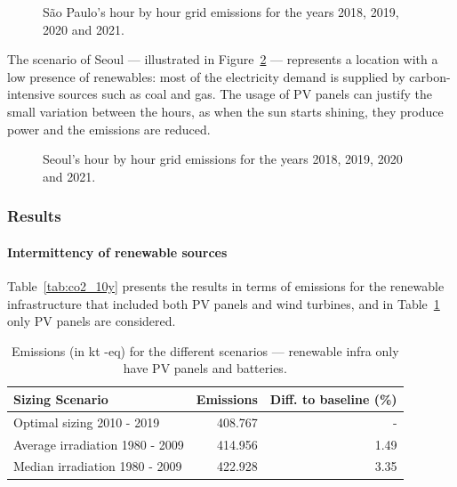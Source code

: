 \begin{figure}[H]
  \centering
  {}
  \caption{São Paulo's hour by hour grid emissions for the years 2018, 2019, 2020 and 2021.}
  \label{fig:co2_sp}
\end{figure}

The scenario of Seoul --- illustrated in Figure~\ref{fig:co2_seoul} --- represents a location with a low presence of renewables: most of the electricity demand is supplied by carbon-intensive sources such as coal and gas. The usage of PV panels can justify the small variation between the hours, as when the sun starts shining, they produce power and the emissions are reduced.


\begin{figure}[H]
  \centering
  {}
  \caption{Seoul's hour by hour grid emissions for the years 2018, 2019, 2020 and 2021.}
  \label{fig:co2_seoul}
\end{figure}




\subsubsection{Results}

\paragraph{Intermittency of renewable sources}

Table~\ref{tab:co2_10y} presents the results in terms of  emissions for the renewable infrastructure that included both PV panels and wind turbines, and in Table~\ref{tab:co2_10y_pv_only} only PV panels are considered.



 \begin{table}[H]   
  \caption{Emissions (in kt -eq) for the different scenarios --- renewable infra only have PV panels and batteries.} \centering

   \label{tab:co2_10y_pv_only}
  
      \begin{tabular}{|l|r|r|}        
        \hline
        \textbf{Sizing Scenario} &  \textbf{Emissions } & \textbf{Diff. to baseline (\%) } \\
       \hline        
        Optimal sizing 2010 - 2019       &       408.767 &  -       \\
        \hline     
        Average irradiation 1980 - 2009  &       414.956 &  1.49    \\
        \hline
        Median irradiation  1980 - 2009  &       422.928 &  3.35   \\
        \hline        
      \end{tabular}
      
    \end{table}


